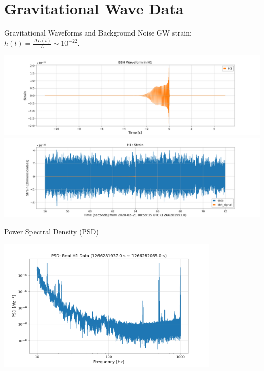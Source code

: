 \documentclass[xcolor=dvipsnames]{beamer}
\begin{document}
\section[GW Data]{Gravitational Wave Data}

\begin{frame}[t]{Gravitational Waveforms and Background Noise}
  GW strain: $h(t) = \frac{\Delta L(t)}{L} \sim 10^{-22}$.
  \begin{center}
    \includegraphics[height=0.3\textheight]{./image/BBH_signal-H1.png}
    \includegraphics[height=0.3\textheight]{./image/BBH_ts-H1.png}
  \end{center}
\end{frame}

\begin{frame}[t]{Power Spectral Density (PSD)}
  \begin{center}
    \includegraphics[width=0.8\textwidth]{image/PSD_H1-1266281937-128.png}
  \end{center}
\end{frame}
\end{document}
